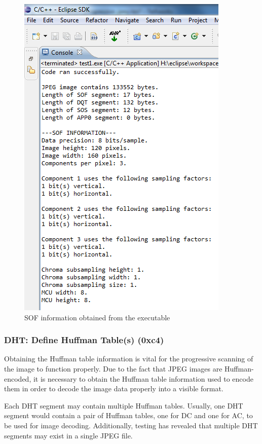 \begin{figure}[!hbtp]
\begin{center}
\includegraphics[scale=1]{figures/SOFOutput.png} 
\end{center}
\caption{SOF information obtained from the executable}
\end{figure}

\newpage
\subsubsection{DHT: Define Huffman Table(s) (0xc4)}
\label{sec:DHT_segment}

Obtaining the Huffman table information is vital for the
progressive scanning of the image to function properly.
Due to the fact that JPEG images are Huffman-encoded,
it is necessary to obtain the Huffman table information
used to encode them in order to decode the image
data properly into a visible format.

Each DHT segment may contain multiple Huffman tables.
Usually, one DHT segment would contain a pair of Huffman 
tables, one for DC and one for AC, to be used for image
decoding. Additionally, testing has revealed that 
multiple DHT segments may exist in a single JPEG file.

